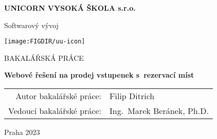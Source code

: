 \pagestyle{empty}
\begin{center}

{\bfseries\large UNICORN VYSOKÁ ŠKOLA s.r.o.}

    \vspace{5mm}

    {\Large Softwarový vývoj}

    \vfill
    \vspace{5mm}

    \centerline{\mbox{\texttt{[image: \\FIGDIR/uu-icon]}}}

    \vfill
    \vspace{5mm}

    {\large\MakeUppercase{Bakalářská práce}}

    \vspace{15mm}

    {\LARGE\bfseries Webové řešení na prodej vstupenek s~rezervací míst}

    \vfill

    \begin{tabular}{rl}
        Autor bakalářské práce:   & Filip Ditrich              \\
        \noalign{\vspace{2mm}}
        Vedoucí bakalářské práce: & Ing.\ Marek Beránek, Ph.D. \\
    \end{tabular}

    \vfill

    Praha 2023

\end{center}
